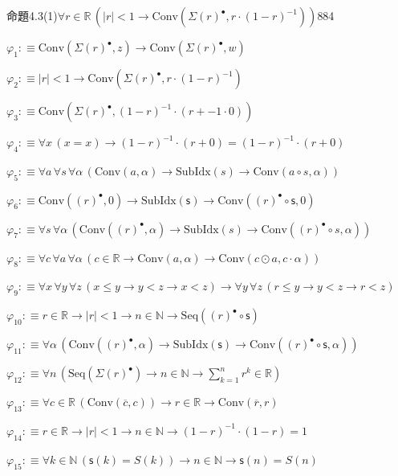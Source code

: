 \begin{fullproof}{命題4.3(1)}{$\forall r \in \mathbb{R}\,(\lvert r \rvert < 1 \to \mathrm{Conv}(\Sigma {(r)^{\bullet}},r \cdot (1 - r)^{-1}))$}{884}
\begin{abbrevlist}
\item $\varphi_{1} :\equiv \mathrm{Conv}(\Sigma {(r)^{\bullet}},z) \to \mathrm{Conv}(\Sigma {(r)^{\bullet}},w)$
\item $\varphi_{2} :\equiv \lvert r \rvert < 1 \to \mathrm{Conv}(\Sigma {(r)^{\bullet}},r \cdot (1 - r)^{-1})$
\item $\varphi_{3} :\equiv \mathrm{Conv}(\Sigma {(r)^{\bullet}},(1 - r)^{-1} \cdot (r + -1 \cdot 0))$
\item $\varphi_{4} :\equiv \forall x\,(x = x) \to (1 - r)^{-1} \cdot (r + 0) = (1 - r)^{-1} \cdot (r + 0)$
\item $\varphi_{5} :\equiv \forall a\,\forall s\,\forall \alpha\,(\mathrm{Conv}(a,\alpha) \to \mathrm{SubIdx}(s) \to \mathrm{Conv}(a \circ s,\alpha))$
\item $\varphi_{6} :\equiv \mathrm{Conv}({(r)^{\bullet}},0) \to \mathrm{SubIdx}(\mathsf{s}) \to \mathrm{Conv}({(r)^{\bullet}} \circ \mathsf{s},0)$
\item $\varphi_{7} :\equiv \forall s\,\forall \alpha\,(\mathrm{Conv}({(r)^{\bullet}},\alpha) \to \mathrm{SubIdx}(s) \to \mathrm{Conv}({(r)^{\bullet}} \circ s,\alpha))$
\item $\varphi_{8} :\equiv \forall c\,\forall a\,\forall \alpha\,(c \in \mathbb{R} \to \mathrm{Conv}(a,\alpha) \to \mathrm{Conv}(c \odot a,c \cdot \alpha))$
\item $\varphi_{9} :\equiv \forall x\,\forall y\,\forall z\,(x \leq y \to y < z \to x < z) \to \forall y\,\forall z\,(r \leq y \to y < z \to r < z)$
\item $\varphi_{10} :\equiv r \in \mathbb{R} \to \lvert r \rvert < 1 \to n \in \mathbb{N} \to \mathrm{Seq}({(r)^{\bullet}} \circ \mathsf{s})$
\item $\varphi_{11} :\equiv \forall \alpha\,(\mathrm{Conv}({(r)^{\bullet}},\alpha) \to \mathrm{SubIdx}(\mathsf{s}) \to \mathrm{Conv}({(r)^{\bullet}} \circ \mathsf{s},\alpha))$
\item $\varphi_{12} :\equiv \forall n\,(\mathrm{Seq}(\Sigma {(r)^{\bullet}}) \to n \in \mathbb{N} \to {\textstyle\sum_{k=1}^{n} {{r}^{k}}} \in \mathbb{R})$
\item $\varphi_{13} :\equiv \forall c \in \mathbb{R}\,(\mathrm{Conv}(\overline{c},c)) \to r \in \mathbb{R} \to \mathrm{Conv}(\overline{r},r)$
\item $\varphi_{14} :\equiv r \in \mathbb{R} \to \lvert r \rvert < 1 \to n \in \mathbb{N} \to (1 - r)^{-1} \cdot (1 - r) = 1$
\item $\varphi_{15} :\equiv \forall k \in \mathbb{N}\,(\mathsf{s}(k) = S(k)) \to n \in \mathbb{N} \to \mathsf{s}(n) = S(n)$

\end{abbrevlist}
\end{fullproof}
